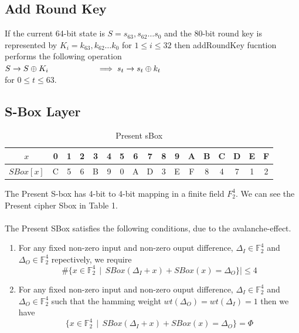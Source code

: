 \documentclass[journal=tosc,preprint]{iacrtrans}
\begin{document}
\subsection{Add Round Key}
If the current 64-bit state  is $S = s_{63},s_{62}\dots s_0$ and the 80-bit round key is represented by $K_i = k_{63},k_{62} \dots k_0$ for $1\leq i \leq 32$   then addRoundKey fucntion performs the following operation\\
\hspace*{30mm}$
	S \xrightarrow{} S \oplus K_i \\
\hspace*{20mm}	\implies s_t \xrightarrow[]{} s_t \oplus k_t 
$\\
for $0\leq t\leq 63$.
\subsection{S-Box Layer}
\begin{table}[h!]
\caption{Present sBox}
\centering
\begin{tabular}{ |c||c|c|c|c|c|c|c|c|c|c|c|c|c|c|c|c| }
		\hline
		$x$ & 0 & 1 & 2 & 3&4& 5& 6&7&8&9&A&B&C&D&E&F  \\ \hline
		$SBox[x]$& C & 5 & 6& B &9 &0 &A &D& 3& E &F& 8& 4 &7& 1& 2 \\ \hline
\end{tabular}
\end{table}
The Present S-box has 4-bit to 4-bit mapping in a finite field $F_2^4$. We can see the Present cipher Sbox in Table 1.
\\\\
The Present SBox satisfies the following conditions, due to the avalanche-effect.\\
\begin{enumerate}
	\item For any fixed non-zero input and non-zero ouput difference, $\Delta_I \in \mathbb{F}_2^4$ and $\Delta_O \in \mathbb{F}_2^4$ repectively, we require
	\begin{equation*}
	\#\{ x \in \mathbb{F}_2^4~~ \vert~~ SBox(\Delta_I +x) + SBox(x) = \Delta_O \}| \leq 4
	\end{equation*}
	
	\item For any fixed non-zero input and non-zero ouput difference, $\Delta_I \in \mathbb{F}_2^4$ and $\Delta_O \in \mathbb{F}_2^4$ such that the hamming weight $wt(\Delta_O) = wt(\Delta_I) = 1$ then we have
	\begin{equation*}
	\{ x \in \mathbb{F}_2^4~~ \vert~~  SBox(\Delta_I +x) + SBox(x) = \Delta_O  \} = \Phi
	\end{equation*}
\end{enumerate}
\end{document}

